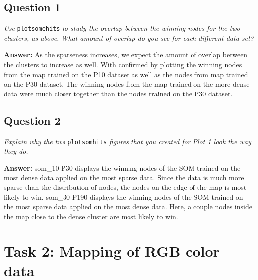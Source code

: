 \documentclass[a4paper]{article}
\begin{document}
\subsection*{Question 1} 

\emph{Use } \texttt{plotsomehits} \emph{ to study the overlap between the winning nodes for the two clusters, as above. What amount of overlap do you see for each different data set?}

\textbf{Answer:} As the sparseness increases, we expect the amount of overlap between the clusters to increase as well. With confirmed by plotting the winning nodes from the map trained on the P10 dataset as well as the nodes from map trained on the P30 dataset. The winning nodes from the map trained on the more dense data were much closer together than the nodes trained on the P30 dataset. 


\subsection*{Question 2}
\emph{Explain why the two }\texttt{plotsomhits} \emph{ figures that you created for Plot 1 look the way they do.}

\textbf{Answer:} som\_10-P30 displays the winning nodes of the SOM trained on the most dense data applied on the most sparse data. Since the data is much more sparse than the distribution of nodes, the nodes on the edge of the map is most likely to win. som\_30-P190 displays the winning nodes of the SOM trained on the most sparse data applied on the most dense data. Here, a couple nodes inside the map close to the dense cluster are most likely to win. 


\section*{Task 2: Mapping of RGB color data}
\end{document}
